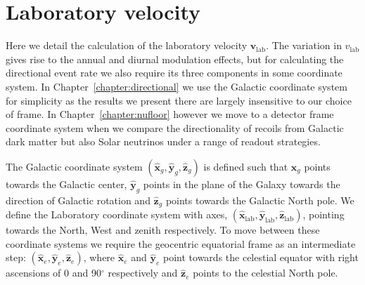 \chapter{Laboratory velocity}\label{app:labvelocity}
Here we detail the calculation of the laboratory velocity $\textbf{v}_\textrm{lab}$. The variation in $v_\textrm{lab}$ gives rise to the annual and diurnal modulation effects, but for calculating the directional event rate we also require its three components in some coordinate system. In Chapter~\ref{chapter:directional} we use the Galactic coordinate system for simplicity as the results we present there are largely insensitive to our choice of frame. In Chapter~\ref{chapter:nufloor} however we move to a detector frame coordinate system when we compare the directionality of recoils from Galactic dark matter but also Solar neutrinos under a range of readout strategies. 

The Galactic coordinate system $(\hat{\textbf{x}}_g,\hat{\textbf{y}}_g,\hat{\textbf{z}}_g)$ is defined such that $\hat{\textbf{x}}_g$ points towards the Galactic center, $\hat{\textbf{y}}_g$ points in the plane of the Galaxy towards the direction of Galactic rotation and $\hat{\textbf{z}}_g$ points towards the Galactic North pole. We define the Laboratory coordinate system with axes, $(\hat{\textbf{x}}_\textrm{lab},\hat{\textbf{y}}_\textrm{lab},\hat{\textbf{z}}_\textrm{lab})$, pointing towards the North, West and zenith respectively. To move between these coordinate systems we require the geocentric equatorial frame as an intermediate step: $(\hat{\textbf{x}}_e,\hat{\textbf{y}}_e,\hat{\textbf{z}}_e)$, where $\hat{\textbf{x}}_e$ and $\hat{\textbf{y}}_e$ point towards the celestial equator with right ascensions of 0 and 90$^\circ$ respectively and $\hat{\textbf{z}}_e$ points to the celestial North pole.

